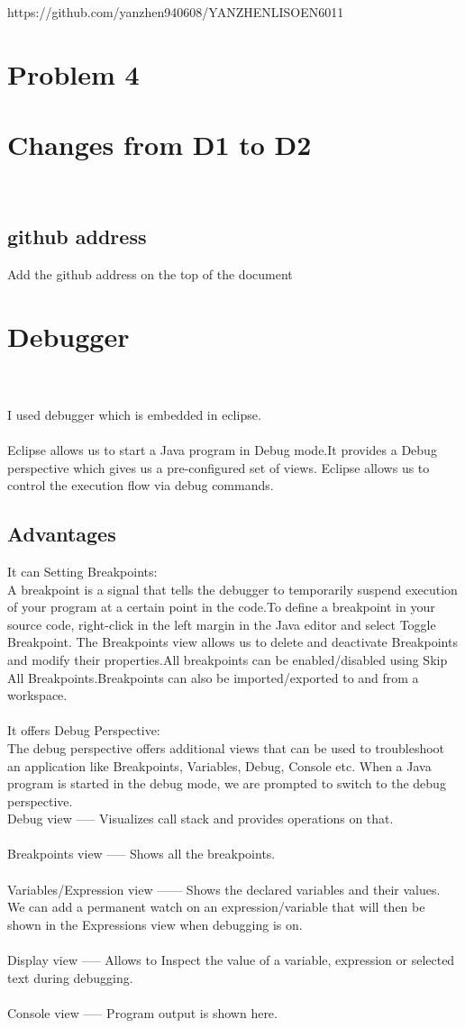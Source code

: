 \documentclass[12pt,letterpaper]{article}
\begin{document}
https://github.com/yanzhen940608/YANZHENLISOEN6011
\section*{Problem 4}
\section{Changes from D1 to D2}\\
\subsection{github address}
Add the github address on the top of the document 
\section{Debugger}\\
\\
I used debugger which is embedded in eclipse.\\
\\
Eclipse allows us to start a Java program in Debug mode.It provides a Debug perspective which gives us a pre-configured set of views. Eclipse allows us to control the execution flow via debug commands.
\subsection{Advantages}
It can Setting Breakpoints:\\
A breakpoint is a signal that tells the debugger to temporarily suspend execution of your program at a certain point in the code.To define a breakpoint in your source code, right-click in the left margin in the Java editor and select Toggle Breakpoint.
The Breakpoints view allows us to delete and deactivate Breakpoints and modify their properties.All breakpoints can be enabled/disabled using Skip All Breakpoints.Breakpoints can also be imported/exported to and from a workspace.\\
\\
It offers Debug Perspective:\\
The debug perspective offers additional views that can be used to troubleshoot an application like Breakpoints, Variables, Debug, Console etc. When a Java program is started in the debug mode, we are prompted to switch to the debug perspective.\\

Debug view ----- Visualizes call stack and provides operations on that.\\
\\
Breakpoints view ----- Shows all the breakpoints.\\
\\
Variables/Expression view –----- Shows the declared variables and their values.  We can add a permanent watch on an expression/variable that will then be shown in the Expressions view when debugging is on.\\
\\
Display view ----- Allows to Inspect the value of a variable, expression or selected text during debugging.\\
\\
Console view ----- Program output is shown here.
\end{document}
